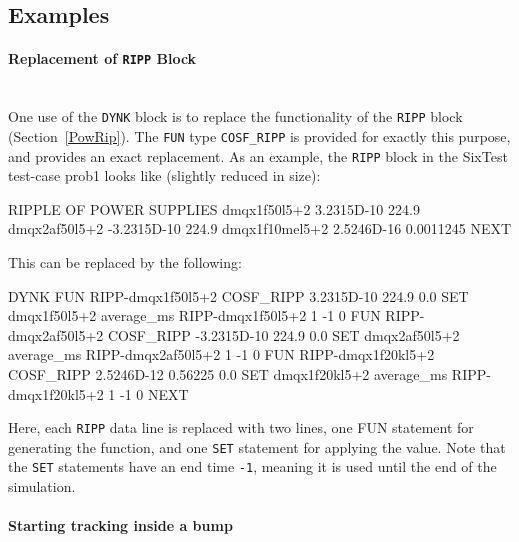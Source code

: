 \subsection{Examples}

\paragraph{Replacement of \texttt{RIPP} Block}~\\
One use of the \texttt{DYNK} block is to replace the functionality of the \texttt{RIPP} block (Section~\ref{PowRip}).
The \texttt{FUN} type \texttt{COSF\_RIPP} is provided for exactly this purpose, and provides an exact replacement.
As an example, the \texttt{RIPP} block in the SixTest test-case prob1 looks like (slightly reduced in size):
\begin{cverbatim}
RIPPLE OF POWER SUPPLIES
  dmqx1f50l5+2      3.2315D-10    224.9
  dmqx2af50l5+2    -3.2315D-10    224.9
  dmqx1f10mel5+2    2.5246D-16    0.0011245
NEXT
\end{cverbatim}
This can be replaced by the following:
\begin{cverbatim}
DYNK
  FUN RIPP-dmqx1f50l5+2 COSF_RIPP 3.2315D-10 224.9 0.0
  SET dmqx1f50l5+2 average_ms RIPP-dmqx1f50l5+2 1 -1 0
  FUN RIPP-dmqx2af50l5+2 COSF_RIPP -3.2315D-10 224.9 0.0
  SET dmqx2af50l5+2 average_ms RIPP-dmqx2af50l5+2 1 -1 0
  FUN RIPP-dmqx1f20kl5+2 COSF_RIPP 2.5246D-12 0.56225 0.0
  SET dmqx1f20kl5+2 average_ms RIPP-dmqx1f20kl5+2 1 -1 0
NEXT
\end{cverbatim}
Here, each \texttt{RIPP} data line is replaced with two lines, one FUN statement for generating the function, and one \texttt{SET} statement for applying the value.
Note that the \texttt{SET} statements have an end time \texttt{-1}, meaning it is used until the end of the simulation.

\paragraph{Starting tracking inside a bump}~\\


